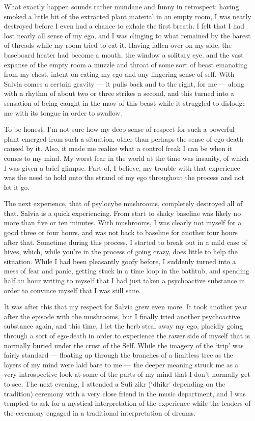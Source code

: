 What exactly happen sounds rather mundane and funny in retrospect: having smoked a little bit of the extracted plant material in an empty room, I was neatly destroyed before I even had a chance to exhale the first breath. I felt that I had lost nearly all sense of my ego, and I was clinging to what remained by the barest of threads while my room tried to eat it. Having fallen over on my side, the baseboard heater had become a mouth, the window a solitary eye, and the vast expanse of the empty room a muzzle and throat of some sort of beast emanating from my chest, intent on eating my ego and any lingering sense of self. With Salvia comes a certain gravity --- it pulls back and to the right, for me --- along with a rhythm of about two or three strikes a second, and this turned into a sensation of being caught in the maw of this beast while it struggled to dislodge me with its tongue in order to swallow.

To be honest, I'm not sure how my deep sense of respect for such a powerful plant emerged from such a situation, other than perhaps the sense of ego-death caused by it. Also, it made me realize what a control freak I can be when it comes to my mind. My worst fear in the world at the time was insanity, of which I was given a brief glimpse. Part of, I believe, my trouble with that experience was the need to hold onto the strand of my ego throughout the process and not let it go.

The next experience, that of psylocybe mushrooms, completely destroyed all of that. Salvia is a quick experiencing. From start to shaky baseline was likely no more than five or ten minutes. With mushrooms, I was clearly not myself for a good three or four hours, and was not back to baseline for another four hours after that. Sometime during this process, I started to break out in a mild case of hives, which, while you're in the process of going crazy, does little to help the situation. While I had been pleasantly goofy before, I suddenly turned into a mess of fear and panic, getting stuck in a time loop in the bathtub, and spending half an hour writing to myself that I had just taken a psychoactive substance in order to convince myself that I was still sane.

It was after this that my respect for Salvia grew even more. It took another year after the episode with the mushrooms, but I finally tried another psychoactive substance again, and this time, I let the herb steal away my ego, placidly going through a sort of ego-death in order to experience the rawer side of myself that is normally buried under the crust of the Self. While the imagery of the `trip' was fairly standard --- floating up through the branches of a limitless tree as the layers of my mind were laid bare to me --- the deeper meaning struck me as a very introspective look at some of the parts of my mind that I don't normally get to see. The next evening, I attended a Sufi zikr (`dhikr' depending on the tradition) ceremony with a very close friend in the music department, and I was tempted to ask for a mystical interpretation of the experience while the leaders of the ceremony engaged in a traditional interpretation of dreams.

